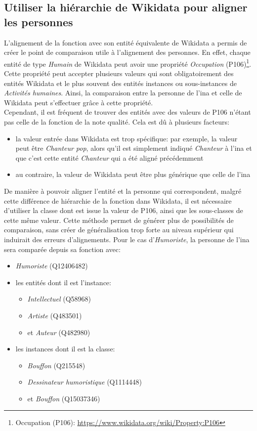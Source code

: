 \subsection{\label{II-C-3-b}Utiliser la hiérarchie de Wikidata pour aligner les personnes}

L'alignement de la fonction avec son entité équivalente de Wikidata a permis de créer le point de comparaison utile à l'alignement des personnes. En effet, chaque entité de type \textit{Humain} de Wikidata peut avoir une propriété \textit{Occupation} (P106)\footnote{Occupation (P106): \url{https://www.wikidata.org/wiki/Property:P106}}. Cette propriété peut accepter plusieurs valeurs qui sont obligatoirement des entités Wikidata et le plus souvent des entités instances ou sous-instances de \textit{Activités humaines}. Ainsi, la comparaison entre la personne de l'\ac{ina} et celle de Wikidata peut s'effectuer grâce à cette propriété.\\

Cependant, il est fréquent de trouver des entités avec des valeurs de P106 n'étant pas celle de la fonction de la note qualité. Cela est dû à plusieurs facteurs:
\begin{itemize}
	\item la valeur entrée dans Wikidata est trop spécifique: par exemple, la valeur peut être \textit{Chanteur pop}, alors qu'il est simplement indiqué \textit{Chanteur} à l'\ac{ina} et que c'est cette entité \textit{Chanteur} qui a été aligné précédemment
	\item au contraire, la valeur de Wikidata peut être plus générique que celle de l'\ac{ina}
\end{itemize}
De manière à pouvoir aligner l'entité et la personne qui correspondent, malgré cette différence de hiérarchie de la fonction dans Wikidata, il est nécessaire d'utiliser la classe dont est issue la valeur de P106, ainsi que les sous-classes de cette même valeur. Cette méthode permet de générer plus de possibilités de comparaison, sans créer de généralisation trop forte au niveau supérieur qui induirait des erreurs d'alignements. Pour le cas d'\textit{Humoriste}, la personne de l'\ac{ina} sera comparée depuis sa fonction avec:
\begin{itemize}
	\item \textit{Humoriste} (Q12406482)
	\item les entités dont il est l'instance:
	\begin{itemize}
		\item \textit{Intellectuel} (Q58968)
		\item \textit{Artiste} (Q483501)
		\item et \textit{Auteur} (Q482980)
	\end{itemize}
	\item les instances dont il est la classe:
	\begin{itemize}
		\item \textit{Bouffon} (Q215548)
		\item \textit{Dessinateur humoristique} (Q1114448)
		\item et \textit{Bouffon} (Q15037346)
	\end{itemize}
\end{itemize}


